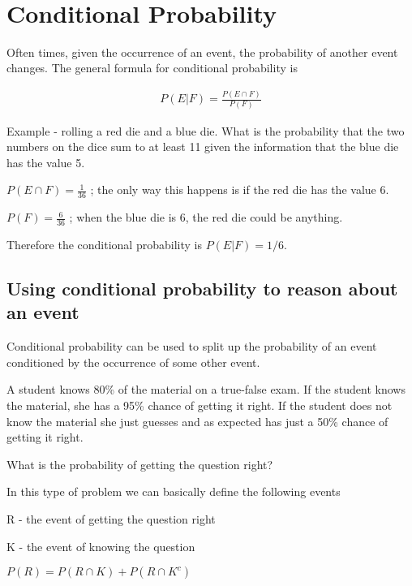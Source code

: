 \documentclass[12pt]{article}
\begin{document}
\begin{center}
\\
\vspace{1cm}
\end{center}

\vspace{0.5cm}\noindent


\section*{Conditional Probability}
Often times, given the occurrence of an event, the probability of another event changes. The general formula for conditional probability is

\begin{align*}
P(E|F) = \frac{P(E \cap F)}{P(F)}
\end{align*}

Example - rolling a red die and a blue die. What is the probability that the two numbers on the dice sum to at least 11 given the information that the blue die has the value 5.

$P(E \cap F) = \frac{1}{36}$ ; the only way this happens is if the red die has the value 6.

$P(F) = \frac{6}{36}$ ; when the blue die is 6, the red die could be anything.

Therefore the conditional probability is $P(E|F) = 1/6$.

\subsection*{Using conditional probability to reason about an event}
Conditional probability can be used to split up the probability of an event conditioned by the occurrence of some other event.

A student knows 80\% of the material on a true-false exam. If the student knows the material, she has a 95\% chance of getting it right. If the student does not know the material she just guesses and as expected has just a 50\% chance of getting it right.

What is the probability of getting the question right?

In this type of problem we can basically define the following events

R - the event of getting the question right

K - the event of knowing the question

$P(R) = P(R \cap K) + P(R \cap K^c)$
\end{document}
